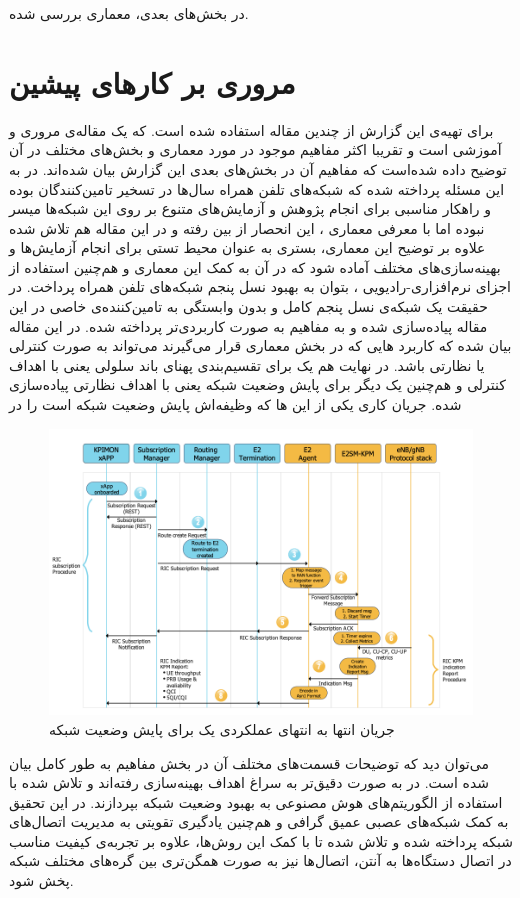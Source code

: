 \documentclass{CSICC}
\begin{document}
در بخش‌های بعدی، معماری 
بررسی شده. 
\section{مروری بر کارهای پیشین}
برای تهیه‌ی این گزارش از چندین مقاله استفاده شده است.
\cite{polese2023understanding}
که یک مقاله‌ی مروری و آموزشی است و تقریبا اکثر مفاهیم موجود در مورد معماری 
و بخش‌های مختلف 
در آن توضیح داده شده‌است که مفاهیم آن در بخش‌های بعدی این گزارش بیان شده‌اند. در
\cite{upadhyaya2022prototyping}
به این مسئله پرداخته شده که شبکه‌های تلفن همراه سال‌ها در تسخیر تامین‌کنندگان بوده‌ و راهکار مناسبی برای انجام پژوهش و آزمایش‌های متنوع بر روی این شبکه‌ها میسر نبوده اما با معرفی معماری
،
این انحصار از بین رفته و در این مقاله هم تلاش شده علاوه بر توضیح این معماری، بستری به عنوان محیط تستی برای انجام آزمایش‌ها و بهینه‌سازی‌های مختلف آماده شود که در آن به کمک این معماری و هم‌چنین استفاده از اجزای نرم‌افزاری-رادیویی
، بتوان به بهبود نسل پنجم شبکه‌های تلفن همراه پرداخت. در حقیقت یک شبکه‌ی نسل پنجم کامل و بدون وابستگی به تامین‌کننده‌ی خاصی در این مقاله پیاده‌سازی شده و به مفاهیم به صورت کاربردی‌تر پرداخته شده. در این مقاله بیان شده که کاربرد 
هایی
که در بخش
معماری 
قرار می‌گیرند می‌تواند به صورت کنترلی یا نظارتی باشد. در نهایت هم یک
برای تقسیم‌بندی پهنای باند سلولی یعنی با اهداف کنترلی و هم‌چنین یک 
دیگر برای پایش وضعیت شبکه یعنی با اهداف نظارتی پیاده‌سا‌زی شده. جریان کاری یکی از این 
ها
که وظیفه‌اش پایش وضعیت شبکه است را در 
\begin{figure}
	\includegraphics[width=\linewidth]{Images/kpimon.png}
	\centering
	\caption{جریان انتها به انتهای عملکردی یک
	برای پایش وضعیت شبکه
\cite{upadhyaya2022prototyping}
}
	\label{fig:kpimon}
\end{figure}
می‌توان دید که توضیحات قسمت‌های مختلف آن در بخش مفاهیم به طور کامل بیان شده است.
در
\cite{orhan2021connection}
به صورت دقیق‌تر به سراغ اهداف بهینه‌سازی رفته‌اند و تلاش شده با استفاده از الگوریتم‌های هوش مصنوعی به بهبود وضعیت شبکه بپردازند. در این تحقیق به کمک شبکه‌های عصبی عمیق گرافی 
و هم‌چنین یادگیری تقویتی
به مدیریت اتصال‌های شبکه پرداخته شده و تلاش شده تا با کمک این روش‌ها، علاوه بر تجربه‌ی کیفیت مناسب در اتصال دستگاه‌ها به آنتن، اتصال‌ها نیز به صورت همگن‌تری بین گره‌های مختلف شبکه پخش شود. 
\end{document}
